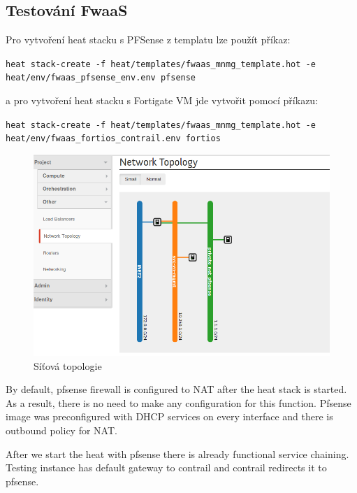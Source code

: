\subsection{Testování FwaaS}\label{sub:interaction}

Pro vytvoření heat stacku s PFSense z templatu lze použít příkaz:

\verb!heat stack-create -f heat/templates/fwaas_mnmg_template.hot -e heat/env/fwaas_pfsense_env.env pfsense!

a pro vytvoření heat stacku s Fortigate VM jde vytvořit pomocí příkazu:

\verb!heat stack-create -f heat/templates/fwaas_mnmg_template.hot -e heat/env/fwaas_fortios_contrail.env fortios!


\begin{figure}[h]
\begin{centering}
\includegraphics[scale=0.45]{images/fwaas_topologie}
\par\end{centering}
\caption{Síťová topologie\label{fig:fwaas_topologie}}
\end{figure}


By default, pfsense firewall is configured to NAT after the heat stack is started. As a result, there is no need to make any configuration for this function. Pfsense image was preconfigured with DHCP services on every interface and there is outbound policy for NAT.

After we start the heat with pfsense there is already functional service chaining. Testing instance has default gateway to contrail and contrail redirects it to pfsense.

